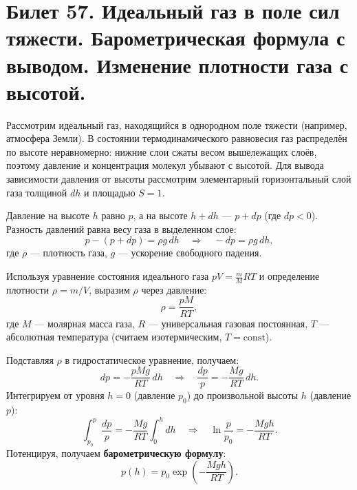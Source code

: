 \section{Билет 57. Идеальный газ в поле сил тяжести. Барометрическая формула с выводом. Изменение плотности газа с высотой.}

\begin{definition}
Рассмотрим идеальный газ, находящийся в однородном поле тяжести (например, атмосфера Земли). В состоянии термодинамического равновесия газ распределён по высоте неравномерно: нижние слои сжаты весом вышележащих слоёв, поэтому давление и концентрация молекул убывают с высотой. Для вывода зависимости давления от высоты рассмотрим элементарный горизонтальный слой газа толщиной $dh$ и площадью $S=1$.
\end{definition}

\begin{theorem}
Давление на высоте $h$ равно $p$, а на высоте $h+dh$ --- $p+dp$ (где $dp<0$). Разность давлений равна весу газа в выделенном слое:
\begin{equation}
    p - (p + dp) = \rho g \, dh \quad \Rightarrow \quad -dp = \rho g \, dh,
\end{equation}
где $\rho$ --- плотность газа, $g$ --- ускорение свободного падения.
\par\noindent Используя уравнение состояния идеального газа $pV = \frac{m}{M}RT$ и определение плотности $\rho = m/V$, выразим $\rho$ через давление:
\begin{equation}
    \rho = \frac{pM}{RT},
\end{equation}
где $M$ --- молярная масса газа, $R$ --- универсальная газовая постоянная, $T$ --- абсолютная температура (считаем изотермическим, $T=\text{const}$).
\par\noindent Подставляя $\rho$ в гидростатическое уравнение, получаем:
\begin{equation}
    dp = -\frac{pMg}{RT} \, dh \quad \Rightarrow \quad \frac{dp}{p} = -\frac{Mg}{RT} \, dh. \label{eq:diff_barometric}
\end{equation}
Интегрируем от уровня $h=0$ (давление $p_0$) до произвольной высоты $h$ (давление $p$):
\begin{equation}
    \int_{p_0}^{p} \frac{dp}{p} = -\frac{Mg}{RT} \int_{0}^{h} dh \quad \Rightarrow \quad \ln\frac{p}{p_0} = -\frac{Mgh}{RT}.
\end{equation}
Потенцируя, получаем \textbf{барометрическую формулу}:
\begin{equation}
    p(h) = p_0 \exp\left(-\frac{Mgh}{RT}\right). \label{eq:barometric_p}
\end{equation}
\end{theorem}

